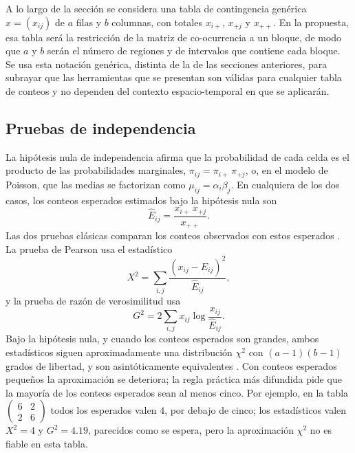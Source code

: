 A lo largo de la sección se considera una tabla de contingencia genérica
$x = (x_{ij})$ de $a$ filas y $b$ columnas, con totales $x_{i+}$, $x_{+j}$ y
$x_{++}$. En la propuesta, esa tabla será la restricción de la matriz de
co-ocurrencia a un bloque, de modo que $a$ y $b$ serán el número de regiones y de
intervalos que contiene cada bloque. Se usa esta notación genérica, distinta de la
de las secciones anteriores, para subrayar que las herramientas que se presentan
son válidas para cualquier tabla de conteos y no dependen del contexto
espacio-temporal en que se aplicarán.

\subsection{Pruebas de independencia}\label{sec:est-independencia}

La hipótesis nula de independencia afirma que la probabilidad de cada celda es el
producto de las probabilidades marginales, $\pi_{ij} = \pi_{i+}\,\pi_{+j}$, o, en
el modelo de Poisson, que las medias se factorizan como $\mu_{ij} = \alpha_i
\beta_j$. En cualquiera de los dos casos, los conteos esperados estimados bajo la
hipótesis nula son
\begin{equation}\label{eq:esperados}
  \hat{E}_{ij} = \frac{x_{i+}\, x_{+j}}{x_{++}} .
\end{equation}
Las dos pruebas clásicas comparan los conteos observados con estos esperados
\citep{Agresti2013}. La prueba de Pearson usa el estadístico
\begin{equation}\label{eq:pearson}
  X^2 = \sum_{i,j} \frac{(x_{ij} - \hat{E}_{ij})^2}{\hat{E}_{ij}} ,
\end{equation}
y la prueba de razón de verosimilitud usa
\begin{equation}\label{eq:g2}
  G^2 = 2 \sum_{i,j} x_{ij} \log \frac{x_{ij}}{\hat{E}_{ij}} .
\end{equation}
Bajo la hipótesis nula, y cuando los conteos esperados son grandes, ambos
estadísticos siguen aproximadamente una distribución $\chi^2$ con
$(a-1)(b-1)$ grados de libertad, y son asintóticamente equivalentes
\citep{Agresti2013}. Con conteos esperados pequeños la aproximación se deteriora;
la regla práctica más difundida pide que la mayoría de los conteos esperados sean
al menos cinco. Por ejemplo, en la tabla
$\begin{pmatrix} 6 & 2 \\ 2 & 6 \end{pmatrix}$ todos los esperados valen $4$, por
debajo de cinco; los estadísticos valen $X^2 = 4$ y $G^2 = 4.19$, parecidos como
se espera, pero la aproximación $\chi^2$ no es fiable en esta tabla.

